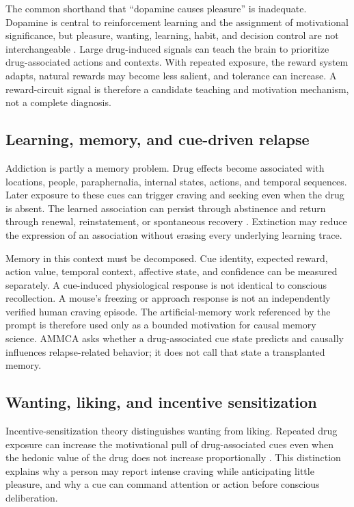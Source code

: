 \documentclass[conference]{IEEEtran}
\begin{document}
The common shorthand that ``dopamine causes pleasure'' is inadequate. Dopamine is central to reinforcement learning and the assignment of motivational significance, but pleasure, wanting, learning, habit, and decision control are not interchangeable \cite{BerridgeRobinson2016}. Large drug-induced signals can teach the brain to prioritize drug-associated actions and contexts. With repeated exposure, the reward system adapts, natural rewards may become less salient, and tolerance can increase. A reward-circuit signal is therefore a candidate teaching and motivation mechanism, not a complete diagnosis.

\subsection{Learning, memory, and cue-driven relapse}
Addiction is partly a memory problem. Drug effects become associated with locations, people, paraphernalia, internal states, actions, and temporal sequences. Later exposure to these cues can trigger craving and seeking even when the drug is absent. The learned association can persist through abstinence and return through renewal, reinstatement, or spontaneous recovery \cite{EverittRobbins2005,HymanMalenkaNestler2006}. Extinction may reduce the expression of an association without erasing every underlying learning trace.

Memory in this context must be decomposed. Cue identity, expected reward, action value, temporal context, affective state, and confidence can be measured separately. A cue-induced physiological response is not identical to conscious recollection. A mouse's freezing or approach response is not an independently verified human craving episode. The artificial-memory work referenced by the prompt is therefore used only as a bounded motivation for causal memory science. AMMCA asks whether a drug-associated cue state predicts and causally influences relapse-related behavior; it does not call that state a transplanted memory.

\subsection{Wanting, liking, and incentive sensitization}
Incentive-sensitization theory distinguishes wanting from liking. Repeated drug exposure can increase the motivational pull of drug-associated cues even when the hedonic value of the drug does not increase proportionally \cite{RobinsonBerridge2008}. This distinction explains why a person may report intense craving while anticipating little pleasure, and why a cue can command attention or action before conscious deliberation.
\end{document}
